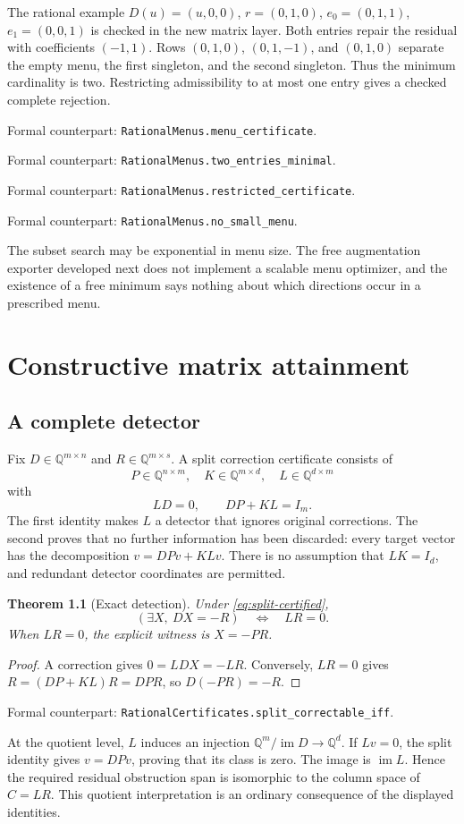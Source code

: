 \documentclass[11pt,letterpaper,oneside,openany]{book}
\theoremstyle{quiet}
\newtheorem{theorem}{Theorem}[chapter]
\newcommand{\Q}{\mathbb{Q}}
\DeclareMathOperator{\im}{im}
\newcommand{\formal}[1]{\par\nobreak\begingroup\footnotesize\color{Slate}\sffamily Formal counterpart: \normalfont\nolinkurl{#1}.\par\endgroup}
\begin{document}
The rational example $D(u)=(u,0,0)$, $r=(0,1,0)$, $e_0=(0,1,1)$, $e_1=(0,0,1)$ is checked in the new matrix layer. Both entries repair the residual with coefficients $(-1,1)$. Rows $(0,1,0)$, $(0,1,-1)$, and $(0,1,0)$ separate the empty menu, the first singleton, and the second singleton. Thus the minimum cardinality is two. Restricting admissibility to at most one entry gives a checked complete rejection.
\formal{RationalMenus.menu_certificate}
\formal{RationalMenus.two_entries_minimal}
\formal{RationalMenus.restricted_certificate}
\formal{RationalMenus.no_small_menu}

The subset search may be exponential in menu size. The free augmentation exporter developed next does not implement a scalable menu optimizer, and the existence of a free minimum says nothing about which directions occur in a prescribed menu.

\chapter{Constructive matrix attainment}\label{ch:matrix-attainment}
\section{A complete detector}
Fix $D\in\Q^{m\times n}$ and $R\in\Q^{m\times s}$. A split correction certificate consists of
\[
 P\in\Q^{n\times m},\quad K\in\Q^{m\times d},\quad L\in\Q^{d\times m}
\]
with
\begin{equation}\label{eq:split-certified}
 LD=0,\qquad DP+KL=I_m.
\end{equation}
The first identity makes $L$ a detector that ignores original corrections. The second proves that no further information has been discarded: every target vector has the decomposition $v=DPv+KLv$. There is no assumption that $LK=I_d$, and redundant detector coordinates are permitted.

\begin{theorem}[Exact detection]\label{thm:split-exact}
Under \eqref{eq:split-certified},
\[
 (\exists X,\ DX=-R)\quad\Longleftrightarrow\quad LR=0.
\]
When $LR=0$, the explicit witness is $X=-PR$.
\end{theorem}
\begin{proof}
A correction gives $0=LDX=-LR$. Conversely, $LR=0$ gives $R=(DP+KL)R=DPR$, so $D(-PR)=-R$.
\end{proof}
\formal{RationalCertificates.split_correctable_iff}

At the quotient level, $L$ induces an injection $\Q^m/\im D\to\Q^d$. If $Lv=0$, the split identity gives $v=DPv$, proving that its class is zero. The image is $\im L$. Hence the required residual obstruction span is isomorphic to the column space of $C=LR$. This quotient interpretation is an ordinary consequence of the displayed identities.
\end{document}
